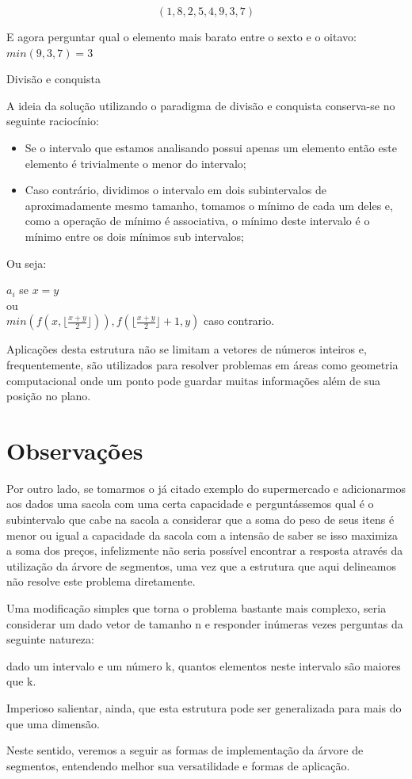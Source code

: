 $$(1, 8, 2, 5, 4, 9, 3, 7)$$

E agora perguntar qual o elemento mais barato entre o sexto e o oitavo: 
$min (9, 3, 7) = 3$

Divisão e conquista

A ideia da solução utilizando o paradigma de divisão e conquista conserva-se no 
seguinte raciocínio:

\begin{itemize}
    
    \item Se o intervalo que estamos analisando possui apenas um elemento então este 
elemento é trivialmente o menor do intervalo;

    \item Caso contrário, dividimos o intervalo em dois subintervalos de 
    aproximadamente mesmo tamanho, tomamos o mínimo de cada um deles e, como 
    a operação de mínimo é associativa, o mínimo deste intervalo é o mínimo 
    entre os dois mínimos sub intervalos;

\end{itemize}

Ou seja: 

\begin{center}
    $a_i$ se $x = y$ 
    \\
    ou
    \\
    $min (f(x, \lfloor{\frac{x+y}{2}}\rfloor)), f(\lfloor{\frac{x+y}{2}}\rfloor + 1, y)$ caso contrario.
\end{center}

Aplicações desta estrutura não se limitam a vetores de números inteiros e, 
frequentemente, são utilizados para resolver problemas em áreas como geometria 
computacional onde um ponto pode guardar muitas informações além de sua posição 
no plano.

\section{Observações}
Por outro lado, se tomarmos o já citado exemplo do supermercado e adicionarmos 
aos dados uma sacola com uma certa capacidade e perguntássemos qual é o 
subintervalo que cabe na sacola a considerar que a soma do peso de seus itens 
é menor ou igual a capacidade da sacola com a intensão de saber se isso maximiza 
a soma dos preços, infelizmente não seria possível encontrar a resposta através 
da utilização da árvore de segmentos, uma vez que a estrutura que aqui delineamos 
não resolve este problema diretamente.

Uma modificação simples que torna o problema bastante mais complexo, seria 
considerar um dado vetor de tamanho n e responder inúmeras vezes perguntas da 
seguinte natureza:

dado um intervalo e um número k, quantos elementos neste intervalo são maiores 
que k.

Imperioso salientar, ainda, que esta estrutura pode ser generalizada para mais 
do que uma dimensão.  

Neste sentido, veremos a seguir as formas de implementação da árvore de 
segmentos, entendendo melhor sua versatilidade e formas de aplicação.

